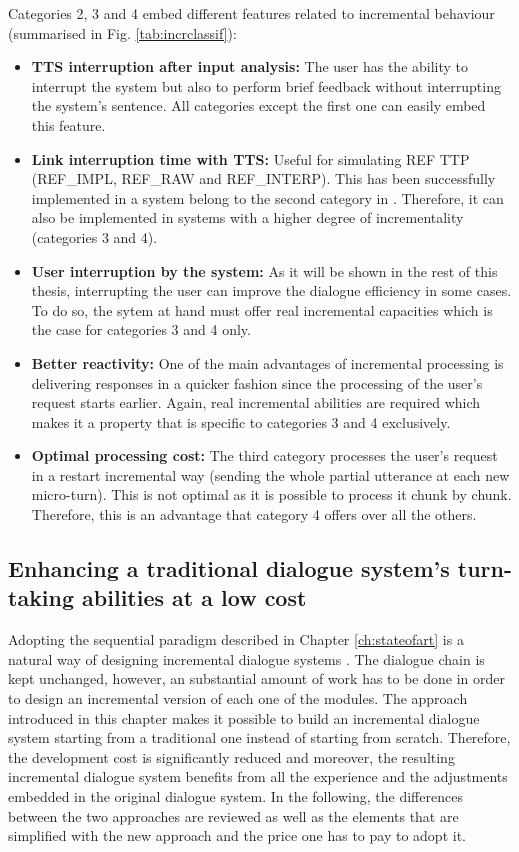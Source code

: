 		Categories 2, 3 and 4 embed different features related to incremental behaviour (summarised in Fig. \ref{tab:incrclassif}):

                \begin{itemize}
                  \item \textbf{TTS interruption after input analysis:} The user has the ability to interrupt the system but also to perform brief feedback without interrupting the system's sentence. All categories except the first one can easily embed this feature.
                  \item \textbf{Link interruption time with TTS:} Useful for simulating REF TTP (REF\_IMPL, REF\_RAW and REF\_INTERP). This has been successfully implemented in a system belong to the second category in \cite{El-Asri2014a}. Therefore, it can also be implemented in systems with a higher degree of incrementality (categories 3 and 4).
                  \item \textbf{User interruption by the system:} As it will be shown in the rest of this thesis, interrupting the user can improve the dialogue efficiency in some cases. To do so, the sytem at hand must offer real incremental capacities which is the case for categories 3 and 4 only.
                  \item \textbf{Better reactivity:} One of the main advantages of incremental processing is delivering responses in a quicker fashion since the processing of the user's request starts earlier. Again, real incremental abilities are required which makes it a property that is specific to categories 3 and 4 exclusively.
                  \item \textbf{Optimal processing cost:} The third category processes the user's request in a restart incremental way (sending the whole partial utterance at each new micro-turn). This is not optimal as it is possible to process it chunk by chunk. Therefore, this is an advantage that category 4 offers over all the others.
                \end{itemize}

	\subsection{Enhancing a traditional dialogue system's turn-taking abilities at a low cost}
    
             Adopting the sequential paradigm described in Chapter \ref{ch:stateofart} is a natural way of designing incremental dialogue systems \cite{Schlangen2011}. The dialogue chain is kept unchanged, however, an substantial amount of work has to be done in order to design an incremental version of each one of the modules. The approach introduced in this chapter makes it possible to build an incremental dialogue system starting from a traditional one instead of starting from scratch. Therefore, the development cost is significantly reduced and moreover, the resulting incremental dialogue system benefits from all the experience and the adjustments embedded in the original dialogue system. In the following, the differences between the two approaches are reviewed as well as the elements that are simplified with the new approach and the price one has to pay to adopt it.

